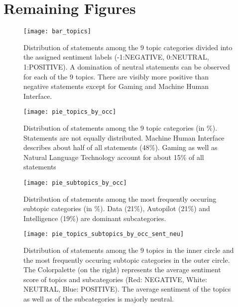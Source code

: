 \section{Remaining Figures}
\begin{figure}[h!]
    \centering
    \texttt{[image: bar\_topics]}
    \caption{
        Distribution of statements among the 9 topic categories divided into the assigned sentiment labels (-1:NEGATIVE, 0:NEUTRAL, 1:POSITIVE).
        A domination of neutral statements can be observed for each of the 9 topics.
        There are visibly more positive than negative statements except for Gaming and Machine Human Interface.
    }
    \label{fig:bar_topics}
    \texttt{[image: pie\_topics\_by\_occ]}
    \caption{
        Distribution of statements among the 9 topic categories (in \%). 
        Statements are not equally distributed.
        Machine Human Interface describes about half of all statements (48\%).
        Gaming as well as Natural Language Technology account for about 15\% of all statements
    }
    \label{fig:pie_topics_by_occ}
\end{figure}
\pagebreak
\begin{figure}[h!]
    \centering
    \texttt{[image: pie\_subtopics\_by\_occ]}
    \caption{
        Distribution of statements among the most frequently occuring subtopic categories (in \%).
        Data (21\%), Autopilot (21\%) and Intelligence (19\%) are dominant subcategories.
    }
    \label{fig:pie_subtopics_by_occ}
    \texttt{[image: pie\_topics\_subtopics\_by\_occ\_sent\_neu]}
    \caption{
        Distribution of statements among the 9 topics in the inner circle and the most frequently occuring subtopic categories in the outer circle.
        The Colorpalette (on the right) represents the average sentiment score of topics and subcategories (Red: NEGATIVE, White: NEUTRAL, Blue: POSITIVE).
        The average sentiment of the topics as well as of the subcategories is majorly neutral.
    }
    \label{fig:pie_topics_subtopics_by_occ_sent_neu}
\end{figure}
